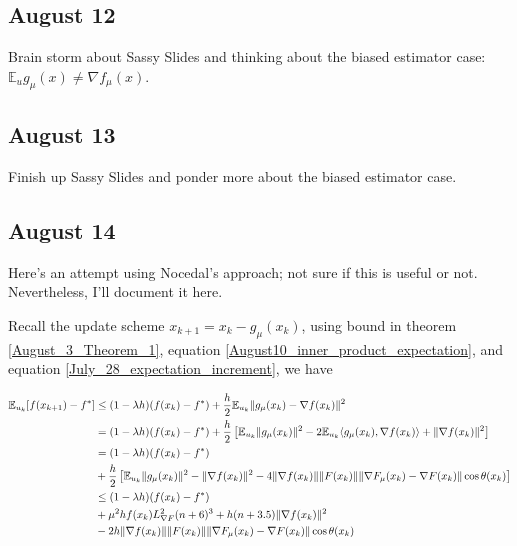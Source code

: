 \documentclass{article}
\begin{document}
\subsection{August 12}

Brain storm about Sassy Slides and thinking about the biased estimator case: $\mathbb{E}_ug_{\mu}(x) \neq \nabla f_{\mu}(x)$. 

\subsection{August 13}

Finish up Sassy Slides and ponder more about the biased estimator case. 

\subsection{August 14}

Here's an attempt using Nocedal's approach; not sure if this is useful or not. Nevertheless, I'll document it here. \newline 

Recall the update scheme $x_{k+1} = x_k - g_{\mu}(x_k)$, using bound in theorem \ref{August_3_Theorem_1}, equation \eqref{August10_inner_product_expectation}, and equation \eqref{July_28_expectation_increment}, we have 

\begin{align}
\mathbb{E}_{u_k}[f(x_{k+1}) - f^*] & \leq (1-\lambda h)(f(x_k) - f^*) + \frac{h}{2}\mathbb{E}_{u_k}\|g_{\mu}(x_k) - \nabla f(x_k)\|^2 \notag \\ & = (1-\lambda h)(f(x_k)-f^*) + \frac{h}{2}\left[\mathbb{E}_{u_k}\|g_{\mu}(x_k)\|^2 - 2\mathbb{E}_{u_k}\langle g_{\mu}(x_k),\nabla f(x_k)\rangle + \|\nabla f(x_k)\|^2 \right] \notag \\ & = (1-\lambda h)(f(x_k) - f^*) \notag \\ & + \frac{h}{2}\left[\mathbb{E}_{u_k}\|g_{\mu}(x_k)\|^2 - \|\nabla f(x_k)\|^2 - 4\|\nabla f(x_k)\| \|F(x_k)\| \|\nabla F_{\mu}(x_k) - \nabla F(x_k)\|\cos \theta(x_k)\right] \notag \\ & \leq (1-\lambda h)(f(x_k)-f^*) \notag  \\ & + \mu^2hf(x_k)L_{\nabla F}^2(n+6)^3 + h(n+3.5)\|\nabla f(x_k)\|^2 \notag \\ & - 2h\|\nabla f(x_k)\| \|F(x_k)\|\|\nabla F_{\mu}(x_k) - \nabla F(x_k)\|\cos \theta(x_k) \label{August14_convergence_analysis}
\end{align}
\end{document}
